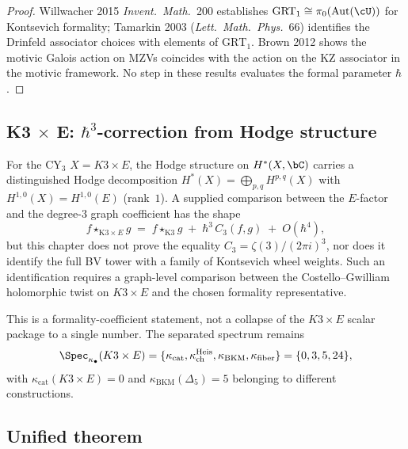 \begin{proof}
Willwacher 2015 \emph{Invent.\ Math.}~200 establishes
$\mathrm{GRT}_1 \cong \pi_0(\mathrm{Aut}(\cU))$ for Kontsevich
formality; Tamarkin 2003 (\emph{Lett.\ Math.\ Phys.}~66) identifies
the Drinfeld associator choices with elements of $\mathrm{GRT}_1$.
Brown 2012 shows the motivic Galois action on MZVs coincides with
the action on the KZ associator in the motivic framework. No step in
these results evaluates the formal parameter \(\hbar\).
\end{proof}

\subsection{K3 $\times$ E: $\hbar^3$-correction from Hodge structure}
\label{subsec:defq-k3e-hodge-correction}

\begin{remark}
\label{rem:defq-k3e-bv-tower-formality}
For the CY$_3$ $X = K3\times E$, the Hodge structure on $H^*(X, \bC)$
carries a distinguished Hodge decomposition
$H^*(X) = \bigoplus_{p, q} H^{p, q}(X)$ with
$H^{1, 0}(X) = H^{1, 0}(E)$ (rank~$1$). A supplied comparison between
the \(E\)-factor and the degree-$3$ graph coefficient has the shape
\begin{equation}
\label{eq:defq-k3e-hbar3-correction}
 f \star_{\mathrm{K3}\times E} g
 \;=\;
 f \star_{\mathrm{K3}} g
 \;+\; \hbar^3\, C_3(f, g) \;+\; O(\hbar^4),
\end{equation}
but this chapter does not prove the equality
\(C_3=\zeta(3)/(2\pi i)^3\), nor does it identify the full BV tower
with a family of Kontsevich wheel weights. Such an identification
requires a graph-level comparison between the Costello--Gwilliam
holomorphic twist on \(K3\times E\) and the chosen formality
representative.

This is a formality-coefficient statement, not a collapse of the
$K3\times E$ scalar package to a single number. The separated spectrum
remains
\[
\Spec_{\kappa_\bullet}(K3\times E)
=\{\kappa_{\mathrm{cat}},\kappa_{\mathrm{ch}}^{\mathrm{Heis}},
\kappa_{\mathrm{BKM}},\kappa_{\mathrm{fiber}}\}
=\{0,3,5,24\},
\]
with $\kappa_{\mathrm{cat}}(K3\times E)=0$ and
$\kappa_{\mathrm{BKM}}(\Delta_5)=5$ belonging to different
constructions.
\end{remark}

\subsection{Unified theorem}
\label{subsec:defq-unified-theorem}

